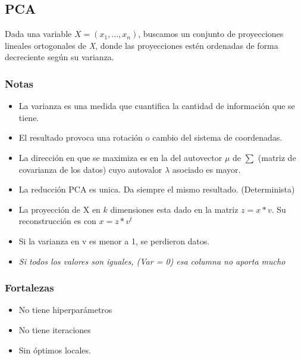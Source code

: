 \documentclass[titlepage,a4paper]{article}
\begin{document}
\subsection{PCA}

Dada una variable \begin{math} X = (x_1,...,x_n) \end{math}, buscamos un conjunto de proyecciones lineales ortogonales de \textit{X}, donde las proyecciones estén ordenadas de forma decreciente según su varianza.

\subsubsection*{Notas}
\begin{itemize}

\item La varianza es una medida que cuantifica la cantidad de información que se tiene.

\item El resultado provoca una rotación o cambio del sistema de coordenadas.

\item La dirección en que se maximiza es en la del autovector $\mu$ de $\sum$ (matriz de covarianza de los datos) cuyo autovalor $\lambda$ asociado es mayor.

\item La reducción PCA es unica. Da siempre el mismo resultado. (Determinista)

\item La proyección de X en $k$ dimensiones esta dado en la matriz $z = x * v$. Su reconstrucción es con $x = z * v^{t}$

\item Si la varianza en v es menor a 1, se perdieron datos.

\item \textit{Si todos los valores son iguales, (Var = 0) esa columna no aporta mucho}

\end{itemize}

\subsubsection*{Fortalezas}
\begin{itemize}
    \item No tiene hiperparámetros
    \item No tiene iteraciones
    \item Sin óptimos locales.
\end{itemize}
\end{document}
